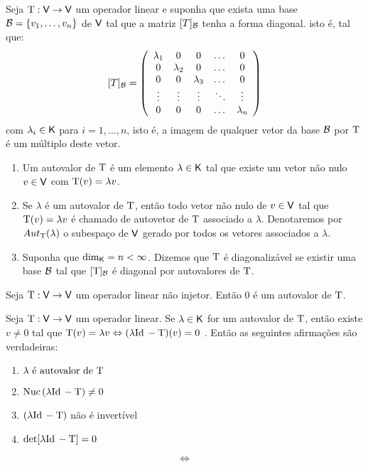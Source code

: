 \documentclass[10pt,a4paper]{book}
\begin{document}
\begin{definition}
	Seja $\mathrm{ T } : \mathsf{ V } \rightarrow \mathsf{ V }$ um operador linear e suponha que exista uma base $\mathcal{ B } = \{ v_1, \dots, v_n \}$ de $\mathsf{ V }$ tal que a matriz $[T]_{\mathcal{ B }}$ tenha a forma diagonal. isto é, tal que:
	\[
		[T]_{\mathcal{ B }} = \left(\begin{array}{ccccc}
			\lambda_1 &         0 &         0 & \dots  &         0 \\
			        0 & \lambda_2 &         0 & \dots  &         0 \\
			        0 &         0 & \lambda_3 & \dots  &         0 \\
			   \vdots &    \vdots &    \vdots & \ddots &    \vdots \\
			        0 &         0 &         0 & \dots  & \lambda_n 
		\end{array}\right)
	\]
	com $\lambda_i \in \mathsf{ K }$ para $i = 1, \dots, n$, isto é, a imagem de qualquer vetor da base $\mathcal{ B }$ por $\mathrm{ T }$ é um múltiplo deste vetor.
	\begin{enumerate}
		\item Um autovalor de $\mathrm{ T }$ é um elemento $\lambda \in \mathsf{ K }$ tal que existe um vetor não nulo $v \in \mathsf{ V }$ com $\mathrm{ T }(v) = \lambda v$.
		\item Se $\lambda$ é um autovalor de $\mathrm{ T }$, então todo vetor não nulo de $v \in \mathsf{ V }$ tal que $\mathrm{ T }(v) = \lambda v$ é chamado de autovetor de $\mathrm{ T }$ associado a $\lambda$. Denotaremos por $Aut_{\mathrm{ T }}(\lambda)$ o subespaço de $\mathsf{ V }$ gerado por todos os vetores associados a $\lambda$.
		\item Suponha que $\dim_{\mathsf{ K }} = n < \infty$. Dizemos que $\mathrm{ T }$ é diagonalizável se existir uma base $\mathcal{ B }$ tal que $[\mathrm{ T }]_{\mathcal{ B }}$ é diagonal por autovalores de $\mathrm{ T }$.
	\end{enumerate}
\end{definition}

\begin{lemma}
	Seja $\mathrm{ T } : \mathsf{ V } \rightarrow \mathsf{ V }$ um operador linear não injetor. Então $0$ é um autovalor de $\mathrm{ T }$.
\end{lemma}

\begin{lemma}
	Seja $\mathrm{ T } : \mathsf{ V } \rightarrow \mathsf{ V } $ um operador linear. Se $\lambda \in \mathsf{ K }$ for um autovalor de $\mathrm{ T }$, então existe $v \neq 0$ tal que $\mathrm{ T }(v) = \lambda v \Leftrightarrow (\lambda \mathrm{ Id }\, - \mathrm{ T })(v) = 0$ . Então as seguintes afirmações são verdadeiras:
	\begin{enumerate}
		\item $\lambda \text{ é autovalor de } \mathrm{ T }$
		\item $\mathrm{ Nuc }\, (\lambda \mathrm{ Id }\, - \mathrm{ T }) \neq 0$
		\item $(\lambda \mathrm{ Id }\, - \mathrm{ T })$ não é invertível
		\item $\det [\lambda \mathrm{ Id }\, - \mathrm{ T }] = 0$
	\end{enumerate}
	\[
		 \Leftrightarrow 
	\]
\end{lemma}
\end{document}
